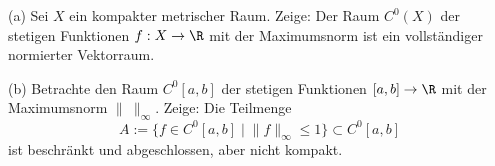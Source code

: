 \begin{prob}
(a) Sei $X$ ein kompakter metrischer Raum. Zeige: Der Raum $C^0(X)$ der
stetigen Funktionen $f:X\to\R$ mit der Maximumsnorm ist ein
vollst\"andiger normierter Vektorraum. 

(b) Betrachte den Raum $C^0[a,b]$ der stetigen Funktionen $[a,b]\to\R$
mit der Maximumsnorm $\|\ \|_\infty$. Zeige: Die Teilmenge
$$
   A:=\{f\in C^0[a,b]\;\bigl|\; \|f\|_\infty\leq 1\}\subset C^0[a,b]
$$
ist beschr\"ankt und abgeschlossen, aber nicht kompakt.  
\end{prob}
